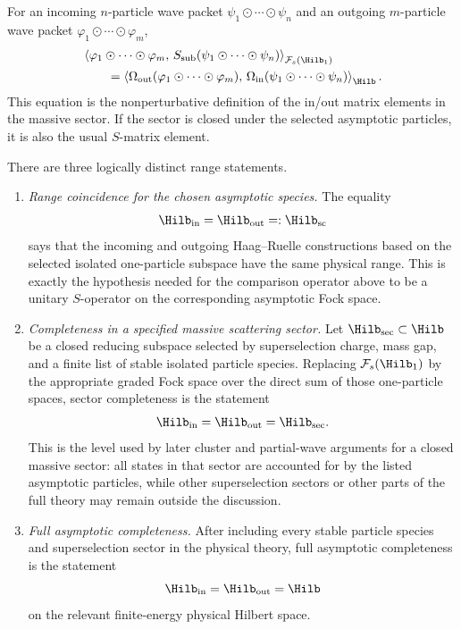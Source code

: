 For an incoming \(n\)-particle wave packet
\(\psi_1\odot\cdots\odot\psi_n\) and an outgoing \(m\)-particle wave packet
\(\varphi_1\odot\cdots\odot\varphi_m\),
\[
\begin{aligned}
&\left\langle
  \varphi_1\odot\cdots\odot\varphi_m,\,
  S_{\mathrm{sub}}(\psi_1\odot\cdots\odot\psi_n)
  \right\rangle_{\mathcal F_s(\Hilb_1)}
\\
&\qquad =
  \left\langle
  \Omega_{\mathrm{out}}
  (\varphi_1\odot\cdots\odot\varphi_m),\,
  \Omega_{\mathrm{in}}
  (\psi_1\odot\cdots\odot\psi_n)
  \right\rangle_{\Hilb}.
\end{aligned}
\]
This equation is the nonperturbative definition of the in/out matrix elements
in the massive sector.  If the sector is closed under the selected asymptotic
particles, it is also the usual \(S\)-matrix element.

\begin{definition}
\label{def:hr-range-completeness-statements}
There are three logically distinct range statements.
\begin{enumerate}[label=(\alph*)]
  \item \emph{Range coincidence for the chosen asymptotic species.}  The
  equality
  \[
    \Hilb_{\mathrm{in}}=\Hilb_{\mathrm{out}}=:\Hilb_{\mathrm{sc}}
  \]
  says that the incoming and outgoing Haag--Ruelle constructions based on the
  selected isolated one-particle subspace have the same physical range.  This
  is exactly the hypothesis needed for the comparison operator above to be a
  unitary \(S\)-operator on the corresponding asymptotic Fock space.

  \item \emph{Completeness in a specified massive scattering sector.}  Let
  \(\Hilb_{\mathrm{sec}}\subset\Hilb\) be a closed reducing subspace selected
  by superselection charge, mass gap, and a finite list of stable isolated
  particle species.  Replacing \(\mathcal F_s(\Hilb_1)\) by the appropriate
  graded Fock space over the direct sum of those one-particle spaces, sector
  completeness is the statement
  \[
    \Hilb_{\mathrm{in}}=\Hilb_{\mathrm{out}}=\Hilb_{\mathrm{sec}} .
  \]
  This is the level used by later cluster and partial-wave arguments for a
  closed massive sector: all states in that sector are accounted for by the
  listed asymptotic particles, while other superselection sectors or other
  parts of the full theory may remain outside the discussion.

  \item \emph{Full asymptotic completeness.}  After including every stable
  particle species and superselection sector in the physical theory, full
  asymptotic completeness is the statement
  \[
    \Hilb_{\mathrm{in}}=\Hilb_{\mathrm{out}}=\Hilb
  \]
  on the relevant finite-energy physical Hilbert space.
\end{enumerate}
\end{definition}

